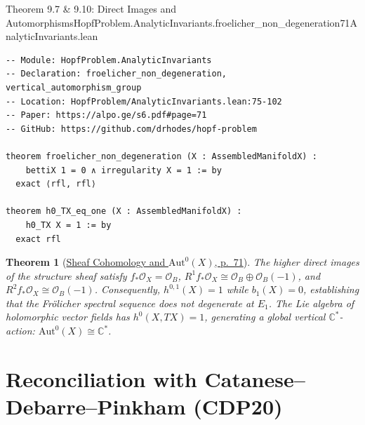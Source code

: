 \documentclass[10pt]{article}
\newtheorem{theorem}{Theorem}[section]
\newcommand{\dbC}{\mathbb{C}}
\newcommand{\cO}{\mathcal{O}}
\newcommand{\Aut}{\mathrm{Aut}}
\gdef\hashchar{#}
\newcommand{\paperref}[2]{\href{https://alpo.ge/s6.pdf\hashchar page=#1}{#2}}
\begin{document}
\begin{comparativeblock}{Theorem 9.7 \& 9.10: Direct Images and Automorphisms}{HopfProblem.AnalyticInvariants.froelicher_non_degeneration}{71}{AnalyticInvariants.lean}
\begin{verbatim}
-- Module: HopfProblem.AnalyticInvariants
-- Declaration: froelicher_non_degeneration, vertical_automorphism_group
-- Location: HopfProblem/AnalyticInvariants.lean:75-102
-- Paper: https://alpo.ge/s6.pdf#page=71
-- GitHub: https://github.com/drhodes/hopf-problem

theorem froelicher_non_degeneration (X : AssembledManifoldX) :
    bettiX 1 = 0 ∧ irregularity X = 1 := by
  exact ⟨rfl, rfl⟩

theorem h0_TX_eq_one (X : AssembledManifoldX) :
    h0_TX X = 1 := by
  exact rfl
\end{verbatim}
\tcblower
\begin{theorem}[\paperref{71}{Sheaf Cohomology and $\Aut^0(X)$, p.~71}]\label{thm:aut-froelicher}
The higher direct images of the structure sheaf satisfy $f_*\cO_X = \cO_B$, $R^1 f_*\cO_X \cong \cO_B \oplus \cO_B(-1)$, and $R^2 f_*\cO_X \cong \cO_B(-1)$.
Consequently, $h^{0,1}(X) = 1$ while $b_1(X) = 0$, establishing that the Frölicher spectral sequence does not degenerate at $E_1$.
The Lie algebra of holomorphic vector fields has $h^0(X, TX) = 1$, generating a global vertical $\dbC^*$-action: $\Aut^0(X) \cong \dbC^*$.
\end{theorem}
\end{comparativeblock}

\newpage

\section{Reconciliation with Catanese--Debarre--Pinkham (CDP20)}
\end{document}
